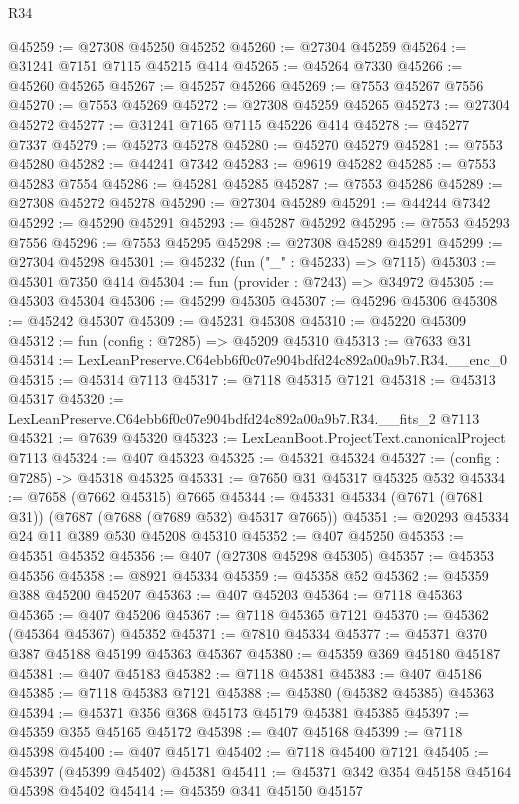 \begin{lexlean}{R34}
\begin{coremodule}
@45259 := @27308 @45250 @45252
@45260 := @27304 @45259
@45264 := @31241 @7151 @7115 @45215 @414
@45265 := @45264 @7330
@45266 := @45260 @45265
@45267 := @45257 @45266
@45269 := @7553 @45267 @7556
@45270 := @7553 @45269
@45272 := @27308 @45259 @45265
@45273 := @27304 @45272
@45277 := @31241 @7165 @7115 @45226 @414
@45278 := @45277 @7337
@45279 := @45273 @45278
@45280 := @45270 @45279
@45281 := @7553 @45280
@45282 := @44241 @7342
@45283 := @9619 @45282
@45285 := @7553 @45283 @7554
@45286 := @45281 @45285
@45287 := @7553 @45286
@45289 := @27308 @45272 @45278
@45290 := @27304 @45289
@45291 := @44244 @7342
@45292 := @45290 @45291
@45293 := @45287 @45292
@45295 := @7553 @45293 @7556
@45296 := @7553 @45295
@45298 := @27308 @45289 @45291
@45299 := @27304 @45298
@45301 := @45232 (fun ("_" : @45233) => @7115)
@45303 := @45301 @7350 @414
@45304 := fun (provider : @7243) => @34972
@45305 := @45303 @45304
@45306 := @45299 @45305
@45307 := @45296 @45306
@45308 := @45242 @45307
@45309 := @45231 @45308
@45310 := @45220 @45309
@45312 := fun (config : @7285) => @45209 @45310
@45313 := @7633 @31
@45314 := LexLeanPreserve.C64ebb6f0c07e904bdfd24c892a00a9b7.R34.__enc_0
@45315 := @45314 @7113
@45317 := @7118 @45315 @7121
@45318 := @45313 @45317
@45320 := LexLeanPreserve.C64ebb6f0c07e904bdfd24c892a00a9b7.R34.__fits_2 @7113
@45321 := @7639 @45320
@45323 := LexLeanBoot.ProjectText.canonicalProject @7113
@45324 := @407 @45323
@45325 := @45321 @45324
@45327 := (config : @7285) -> @45318 @45325
@45331 := @7650 @31 @45317 @45325 @532
@45334 := @7658 (@7662 @45315) @7665
@45344 := @45331 @45334 (@7671 (@7681 @31)) (@7687 (@7688 (@7689 @532) @45317 @7665))
@45351 := @20293 @45334 @24 @11 @389 @530 @45208 @45310
@45352 := @407 @45250
@45353 := @45351 @45352
@45356 := @407 (@27308 @45298 @45305)
@45357 := @45353 @45356
@45358 := @8921 @45334
@45359 := @45358 @52
@45362 := @45359 @388 @45200 @45207
@45363 := @407 @45203
@45364 := @7118 @45363
@45365 := @407 @45206
@45367 := @7118 @45365 @7121
@45370 := @45362 (@45364 @45367) @45352
@45371 := @7810 @45334
@45377 := @45371 @370 @387 @45188 @45199 @45363 @45367
@45380 := @45359 @369 @45180 @45187
@45381 := @407 @45183
@45382 := @7118 @45381
@45383 := @407 @45186
@45385 := @7118 @45383 @7121
@45388 := @45380 (@45382 @45385) @45363
@45394 := @45371 @356 @368 @45173 @45179 @45381 @45385
@45397 := @45359 @355 @45165 @45172
@45398 := @407 @45168
@45399 := @7118 @45398
@45400 := @407 @45171
@45402 := @7118 @45400 @7121
@45405 := @45397 (@45399 @45402) @45381
@45411 := @45371 @342 @354 @45158 @45164 @45398 @45402
@45414 := @45359 @341 @45150 @45157

\end{coremodule}
\end{lexlean}
